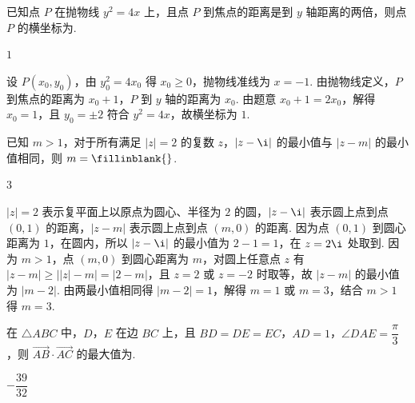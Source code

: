 \documentclass[UTF8,a4paper,oneside,11pt]{ctexbook}
\begin{document}
\begin{problem}
已知点 \(P\) 在抛物线 \(y^2=4x\) 上，且点 \(P\) 到焦点的距离是到 \(y\) 轴距离的两倍，则点 \(P\) 的横坐标为\fillinblank{}.
\end{problem}

\begin{answer}
\(1\)
\end{answer}

\begin{solution}
设 \(P(x_0,y_0)\)，由 \(y_0^2=4x_0\) 得 \(x_0\ge0\)，抛物线准线为 \(x=-1\). 由抛物线定义，\(P\) 到焦点的距离为 \(x_0+1\)，\(P\) 到 \(y\) 轴的距离为 \(x_0\). 由题意 \(x_0+1=2x_0\)，解得 \(x_0=1\)，且 \(y_0=\pm2\) 符合 \(y^2=4x\)，故横坐标为 \(1\).
\end{solution}

\begin{problem}
已知 \(m>1\)，对于所有满足 \(|z|=2\) 的复数 \(z\)，\(|z-\i|\) 的最小值与 \(|z-m|\) 的最小值相同，则 \(m=\fillinblank{}\).
\end{problem}

\begin{answer}
\(3\)
\end{answer}

\begin{solution}
\(|z|=2\) 表示复平面上以原点为圆心、半径为 \(2\) 的圆，\(|z-\i|\) 表示圆上点到点 \((0,1)\) 的距离，\(|z-m|\) 表示圆上点到点 \((m,0)\) 的距离. 因为点 \((0,1)\) 到圆心距离为 \(1\)，在圆内，所以 \(|z-\i|\) 的最小值为 \(2-1=1\)，在 \(z=2\i\) 处取到. 因为 \(m>1\)，点 \((m,0)\) 到圆心距离为 \(m\)，对圆上任意点 \(z\) 有 \(|z-m|\ge\big||z|-m\big|=|2-m|\)，且 \(z=2\) 或 \(z=-2\) 时取等，故 \(|z-m|\) 的最小值为 \(|m-2|\). 由两最小值相同得 \(|m-2|=1\)，解得 \(m=1\) 或 \(m=3\)，结合 \(m>1\) 得 \(m=3\).
\end{solution}

\begin{problem}
在 \(\triangle ABC\) 中，\(D\)，\(E\) 在边 \(BC\) 上，且 \(BD=DE=EC\)，\(AD=1\)，\(\angle DAE=\dfrac{\pi}{3}\)，则 \(\overrightarrow{AB}\cdot\overrightarrow{AC}\) 的最大值为\fillinblank{}.

\end{problem}

\begin{answer}
\(-\dfrac{39}{32}\)
\end{answer}
\end{document}
